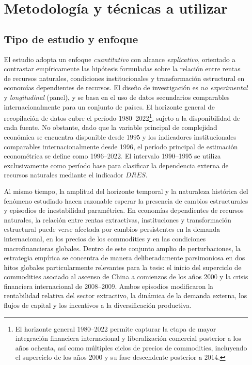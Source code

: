 \documentclass[../../PTFM.tex]{subfiles}
\begin{document}


	\chapter{Metodología y técnicas a utilizar}
	\label{chap:metodologia}


	\section{Tipo de estudio y enfoque}
	\label{sec:tipo-de-estudio}

	El estudio adopta un enfoque \emph{cuantitativo} con alcance
	\emph{explicativo}, orientado a contrastar empíricamente las hipótesis
	formuladas sobre la relación entre rentas de recursos naturales,
	condiciones institucionales y transformación estructural en economías
	dependientes de recursos. El diseño de investigación es
	\emph{no experimental} y \emph{longitudinal} (panel), y se basa en el
	uso de datos secundarios comparables internacionalmente para un conjunto
	de países. El horizonte general de recopilación de datos cubre el período
	1980--2022\footnote{
		El horizonte general 1980--2022 permite capturar la etapa de mayor integración
		financiera internacional y liberalización comercial posterior a los años
		ochenta, así como múltiples ciclos de precios de commodities,
		incluyendo el superciclo de los años 2000 y su fase descendente
		posterior a 2014.}, sujeto a la disponibilidad de cada fuente. No obstante, dado
	que la variable principal de complejidad económica se encuentra disponible
	desde 1995 y los indicadores institucionales comparables
	internacionalmente desde 1996, el período principal de estimación
	econométrica se define como 1996--2022. El intervalo 1990--1995 se utiliza
	exclusivamente como período base para clasificar la dependencia externa de
	recursos naturales mediante el indicador $DRES$.

	Al mismo tiempo, la amplitud del horizonte temporal y la naturaleza
	histórica del fenómeno estudiado hacen razonable esperar la presencia de
	cambios estructurales y episodios de inestabilidad paramétrica. En
	economías dependientes de recursos naturales, la relación entre rentas
	extractivas, instituciones y transformación estructural puede verse
	afectada por cambios persistentes en la demanda internacional, en los
	precios de los commodities y en las condiciones macrofinancieras
	globales. Dentro de este conjunto amplio de perturbaciones, la estrategia
	empírica se concentra de manera deliberadamente parsimoniosa en dos hitos
	globales particularmente relevantes para la tesis: el inicio del
	superciclo de commodities asociado al ascenso de China a comienzos de los
	años 2000 y la crisis financiera internacional de 2008--2009. Ambos
	episodios modificaron la rentabilidad relativa del sector extractivo, la
	dinámica de la demanda externa, los flujos de capital y los incentivos a
	la diversificación productiva.
\end{document}
